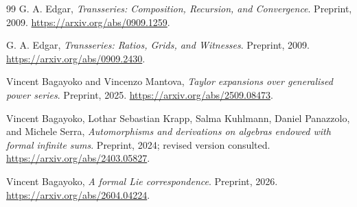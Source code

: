 \documentclass[11pt,a4paper]{article}
\theoremstyle{definition}
\theoremstyle{remark}
\begin{document}
\begin{thebibliography}{99}
G. A. Edgar, \emph{Transseries: Composition, Recursion, and Convergence}.
Preprint, 2009. \url{https://arxiv.org/abs/0909.1259}.

G. A. Edgar, \emph{Transseries: Ratios, Grids, and Witnesses}.
Preprint, 2009. \url{https://arxiv.org/abs/0909.2430}.

Vincent Bagayoko and Vincenzo Mantova,
\emph{Taylor expansions over generalised power series}.
Preprint, 2025. \url{https://arxiv.org/abs/2509.08473}.

Vincent Bagayoko, Lothar Sebastian Krapp, Salma Kuhlmann,
Daniel Panazzolo, and Michele Serra,
\emph{Automorphisms and derivations on algebras endowed with formal infinite
sums}. Preprint, 2024; revised version consulted.
\url{https://arxiv.org/abs/2403.05827}.

Vincent Bagayoko, \emph{A formal Lie correspondence}.
Preprint, 2026. \url{https://arxiv.org/abs/2604.04224}.

\end{thebibliography}
\endgroup
\end{document}
